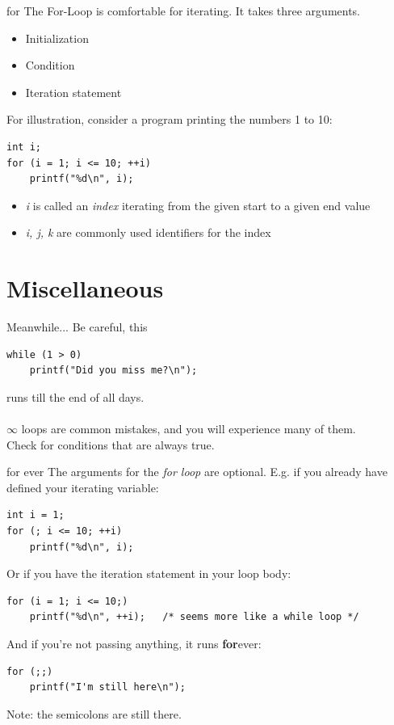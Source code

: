 \begin{frame}[fragile]{for}
	The For-Loop is comfortable for iterating. It takes three arguments.
	\begin{itemize}
		\item Initialization
		\item Condition
		\item Iteration statement
	\end{itemize}
	\bigskip
	For illustration, consider a program printing the numbers 1 to 10:
	\begin{lstlisting}[numbers=none]
int i;
for (i = 1; i <= 10; ++i)
	printf("%d\n", i);
\end{lstlisting}
	\begin{itemize}
		\item \textit{i} is called an \textit{index} iterating from the given start to a given end value
		\item \textit{i, j, k} are commonly used identifiers for the index
	\end{itemize}
\end{frame}

\section{Miscellaneous}
\begin{frame}[fragile]{Meanwhile...}
	Be careful, this
	\begin{lstlisting}[numbers=none]
while (1 > 0)
	printf("Did you miss me?\n");
\end{lstlisting}
runs till the end of all days.\\
\ \\$\infty$ loops are common mistakes, and you will experience many of them.\\
Check for conditions that are always true.
\end{frame}

\begin{frame}[fragile]{for ever}
	The arguments for the \textit{for loop} are optional. E.g. if you already have defined your iterating variable:
	\begin{lstlisting}[numbers=none]
int i = 1;
for (; i <= 10; ++i)
	printf("%d\n", i);
\end{lstlisting}
	Or if you have the iteration statement in your loop body:
	\begin{lstlisting}[numbers=none]
for (i = 1; i <= 10;)
	printf("%d\n", ++i);   /* seems more like a while loop */
\end{lstlisting}
	And if you're not passing anything, it runs \textbf{for}ever:
	\begin{lstlisting}[numbers=none]
for (;;)
	printf("I'm still here\n");
\end{lstlisting}
Note: the semicolons are still there.
\end{frame}

